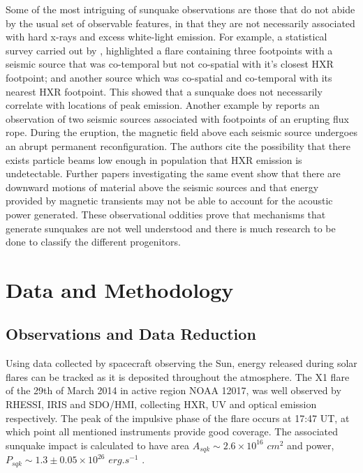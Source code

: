 Some of the most intriguing of sunquake observations are those that do not abide by the usual set of observable features, in that they are not necessarily associated with hard x-rays and excess white-light emission. For example, a statistical survey carried out by \cite{2012SoPh..277..317P}, highlighted a flare containing three footpoints with a seismic source that was co-temporal but not co-spatial with it's closest HXR footpoint; and another source which was co-spatial and co-temporal with its nearest HXR footpoint. This showed that a sunquake does not necessarily correlate with locations of peak emission. Another example by \cite{2011ApJ...741L..35Z} reports an observation of two seismic sources associated with footpoints of an erupting flux rope. During the eruption, the magnetic field above each seismic source undergoes an abrupt permanent reconfiguration. The authors cite the possibility that there exists particle beams low enough in population that HXR emission is undetectable. Further papers investigating the same event \citep{2013SoPh..284..315Z} show that there are downward motions of material above the seismic sources and that energy provided by magnetic transients may not be able to account for the acoustic power generated. These observational oddities prove that mechanisms that generate sunquakes are not well understood and there is much research to be done to classify the different progenitors.

\section{Data and Methodology}
\subsection{Observations and Data Reduction}
Using data collected by spacecraft observing the Sun, energy released during solar flares can be tracked as it is deposited throughout the atmosphere. The X1 flare of the 29th of March 2014 in active region NOAA 12017, was well observed by RHESSI, IRIS and SDO/HMI, collecting HXR, UV and optical emission respectively. The peak of the impulsive phase of the flare occurs at 17:47 UT, at which point all mentioned instruments provide good coverage. The associated sunquake impact is calculated to have area $A_{sqk} \sim 2.6{\times}10^{16}$ $cm^{2}$ and power, $P_{sqk} \sim 1.3\pm0.05{\times}10^{26}$ $erg.s^{-1}$ \citep{2014ApJ...796...85J}.

